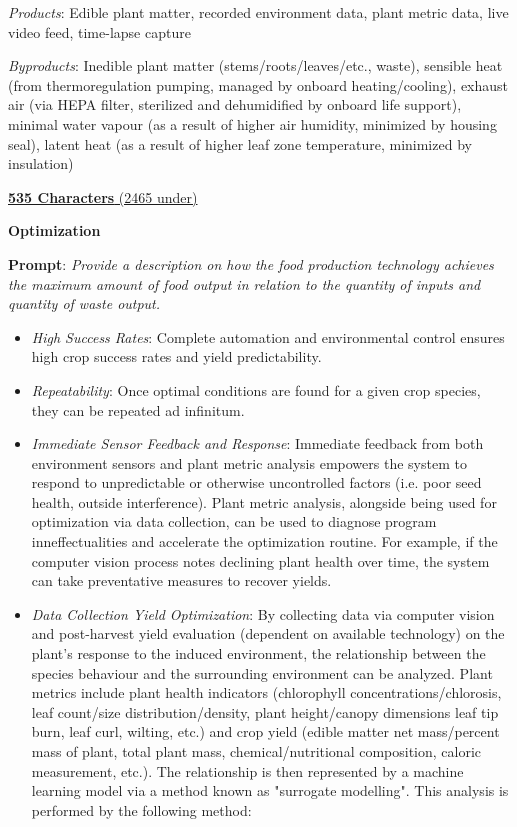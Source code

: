 \documentclass{report}
\begin{document}
\textit{Products}: Edible plant matter, recorded environment data, plant metric data, live video feed, time-lapse capture

\textit{Byproducts}: Inedible plant matter (stems/roots/leaves/etc., waste), sensible heat (from thermoregulation pumping, managed by onboard heating/cooling), exhaust air (via HEPA filter, sterilized and dehumidified by onboard life support), minimal water vapour (as a result of higher air humidity, minimized by housing seal), latent heat (as a result of higher leaf zone temperature, minimized by insulation)

\uline{\textbf{535 Characters} (2465 under)}

\textbf{Optimization}
\label{sec:resource-optimization}

\textbf{Prompt}: \textit{Provide a description on how the food production technology achieves the maximum amount of food output in relation to the quantity of inputs and quantity of waste output.} 


\begin{itemize}
    \item \textit{High Success Rates}: Complete automation and environmental control ensures high crop success rates and yield predictability.
    \item \textit{Repeatability}: Once optimal conditions are found for a given crop species, they can be repeated ad infinitum.
    \item \textit{Immediate Sensor Feedback and Response}: Immediate feedback from both environment sensors and plant metric analysis empowers the system to respond to unpredictable or otherwise uncontrolled factors (i.e. poor seed health, outside interference). Plant metric analysis, alongside being used for optimization via data collection, can be used to diagnose program inneffectualities and accelerate the optimization routine. For example, if the computer vision process notes declining plant health over time, the system can take preventative measures to recover yields.
    \item \textit{Data Collection Yield Optimization}: By collecting data via computer vision and post-harvest yield evaluation (dependent on available technology) on the plant's response to the induced environment, the relationship between the species behaviour and the surrounding environment can be analyzed. Plant metrics include plant health indicators (chlorophyll concentrations/chlorosis, leaf count/size distribution/density, plant height/canopy dimensions leaf tip burn, leaf curl, wilting, etc.) and crop yield (edible matter net mass/percent mass of plant, total plant mass, chemical/nutritional composition, caloric measurement, etc.). The relationship is then represented by a machine learning model via a method known as "surrogate modelling". This analysis is performed by the following method:
    
\end{itemize}
\end{document}
